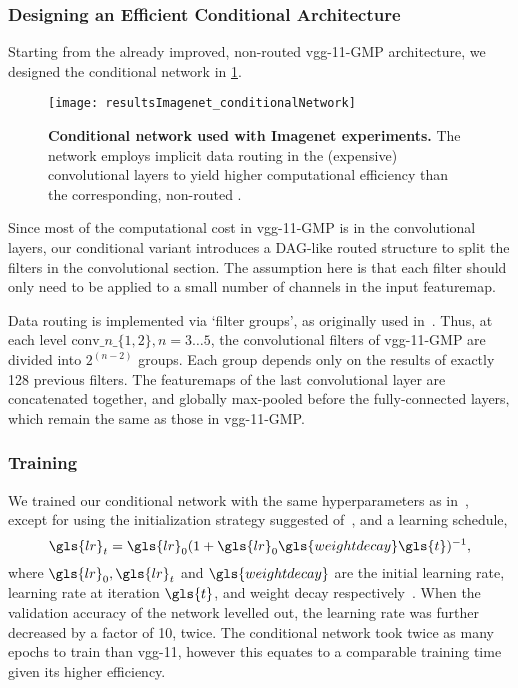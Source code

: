\documentclass[thesis]{subfiles}
\begin{document}
	\subsubsection{Designing an Efficient Conditional Architecture}
	Starting from the already improved, non-routed \gls{vgg}-11-GMP architecture, we designed the conditional network in \cref{fig:Imagenet_CondNet}.
	\begin{figure}[tbp]
		\centering
		\texttt{[image: resultsImagenet\_conditionalNetwork]}
		\caption[Conditional network used with ILSVRC experiments]{\textbf{Conditional network used with Imagenet experiments.} The network employs implicit data routing in the (expensive) convolutional layers to yield higher computational efficiency than the corresponding, non-routed .}\label{fig:Imagenet_CondNet}
	\end{figure}
	Since most of the computational cost in \gls{vgg}-11-GMP is in the convolutional layers, our conditional variant 
	introduces a DAG-like routed structure to split the filters in the convolutional section.
	The assumption here is that each filter should only need to be applied to a small number of channels in the input \gls{featuremap}.
	
	Data routing is implemented via `filter groups', as originally used in~\citep{Krizhevsky2012}. 
	Thus, at each level $\textrm{conv}\_n\_\{1,2\}, n=3\ldots 5$, the convolutional filters of \gls{vgg}-11-GMP are 
	divided into $2^{(n-2)}$ groups. Each group depends only on the results of exactly 128 previous filters. 
	The \glspl{featuremap} of the last convolutional layer are concatenated together, and globally max-pooled
	before the fully-connected layers, which remain the same as those in \gls{vgg}-11-GMP.
	
	\subsubsection{Training}
	We trained our conditional network with the same hyperparameters as in~\citep{Simonyan2014verydeep}, 
	except for using the initialization strategy suggested of~\citep{He2015b}, and a learning schedule,
    \begin{equation}
        \gls{lr}_t = \gls{lr}_0(1+\gls{lr}_0\gls{weightdecay} \gls{t})^{-1},
    \end{equation}
	where $\gls{lr}_0,\gls{lr}_t$ and $\gls{weightdecay}$ are the initial learning rate, learning rate at iteration $\gls{t}$, and weight decay respectively~\citep{Bottou2012sgdtricks}.
	When the validation accuracy of the network levelled out, the learning rate was further decreased by a factor of 10, twice. 
	The conditional network took twice as many epochs to train than \gls{vgg}-11, however this equates to a comparable
	training time given its higher efficiency.
\end{document}
